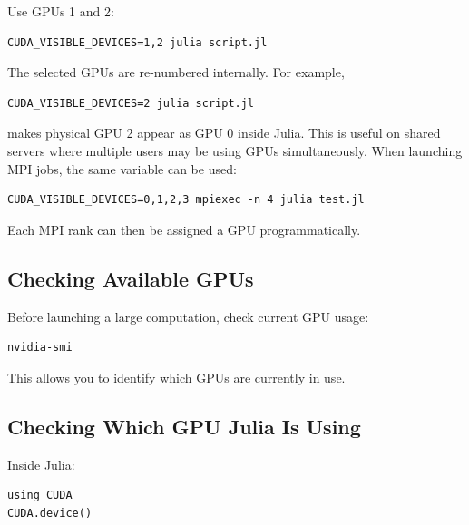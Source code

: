 Use GPUs 1 and 2: 

\begin{lstlisting} 
CUDA_VISIBLE_DEVICES=1,2 julia script.jl 
\end{lstlisting} 

The selected GPUs are re-numbered internally. For example, 

\begin{lstlisting} 
CUDA_VISIBLE_DEVICES=2 julia script.jl 
\end{lstlisting} 

makes physical GPU 2 appear as GPU 0 inside Julia. This is useful on shared servers where multiple users may be using GPUs simultaneously. When launching MPI jobs, the same variable can be used: 

\begin{lstlisting} 
CUDA_VISIBLE_DEVICES=0,1,2,3 mpiexec -n 4 julia test.jl 
\end{lstlisting} 

Each MPI rank can then be assigned a GPU programmatically.

\subsection{Checking Available GPUs} 

Before launching a large computation, check current GPU usage: 

\begin{lstlisting} 
nvidia-smi 
\end{lstlisting} 

This allows you to identify which GPUs are currently in use.

\subsection{Checking Which GPU Julia Is Using} 

Inside Julia: 

\begin{lstlisting} 
using CUDA 
CUDA.device() 
\end{lstlisting}
